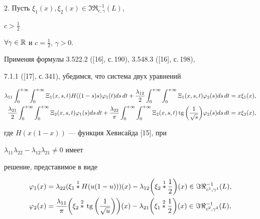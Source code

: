 \medskip 


 


2. Пусть $\xi_1(x),\xi_2(x)\in\Im\Re^{-1}_{c,\gamma}(L)$, 


$c>\frac{1}{2}$ 


$\forall\gamma\in\Bbb R$ и $c=\frac{1}{2}$, $\gamma>0$. 


Применяя формулы 3.522.2 ([16], с.\,190), 3.548.3 ([16], с.\,198), 


7.1.1 ([17], с.\,341), убедимся, что система двух уравнений 


\begin{align*} 


\lambda_{11}\int^{+\infty}_0\int^{+\infty}_0\Xi_1(x,s,t) 


H((1-s)s)\varphi_1(t)ds\,dt+\frac{\lambda_{12}}{2} 


\int^{+\infty}_0\int^{+\infty}_0\Xi_1(x,s,t)\varphi_2(s)ds\,dt 


&=x\xi_1(x), \\ 


% 


\frac{\lambda_{21}}{2}\int^{+\infty}_0\int^{+\infty}_0\Xi_2(x,s,t) 


\varphi_1(s)ds\,dt+ 


\frac{\lambda_{22}}{\pi}\int^{+\infty}_0\int^{+\infty}_0\Xi_2(x,s,t) 


\tg\bigg(\frac{1}{\sqrt{s}} \bigg)\varphi_2(s)ds\,dt 


&=x\xi_2(x), 


\end{align*} 


где $H(x(1-x))$ --- функция Хевисайда [15], при 


$\lambda_{11}\lambda_{22}-\lambda_{12}\lambda_{21}\ne0$ имеет 


решение, представимое в виде 


\begin{align*} 


\varphi_1(x)&=\lambda_{22}(\xi_1\up{1}{*}H(u(1-u)))(x)- 


\lambda_{12}\bigg(\xi_2\up{1}{*}\frac{1}{2} \bigg)(x) 


\in\Im\Re^{-1}_{c^1,\gamma^1}(L), \\ 


% 


\varphi_2(x)&=\frac{\lambda_{11}}{\pi}\bigg(\xi_2\up{2}{*}\tg 


\bigg(\frac{1}{\sqrt{u}}\bigg)\bigg)(x)-\lambda_{21} 


\bigg(\xi_1\up{2}{*}\frac{1}{2} \bigg)(x) 


\in\Im\Re^{-1}_{c^2,\gamma^2}(L), 


\end{align*} 


